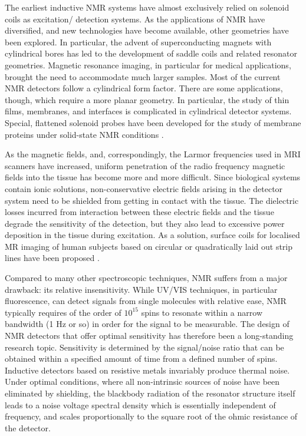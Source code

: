 The earliest inductive NMR systems have almost exclusively relied on solenoid coils as excitation/
detection systems. As the applications of NMR have diversified, and new technologies have become 
available, other geometries have been explored. In particular, the advent of superconducting magnets 
with cylindrical bores has led to the development of saddle coils and related resonator geometries. 
Magnetic resonance imaging, in particular for medical applications, brought the need to accommodate 
much larger samples. 
Most of the current NMR detectors follow a cylindrical form factor. There are some 
applications, though, which require a more planar geometry. In particular, the study of thin films, 
membranes, and interfaces is complicated in cylindrical detector systems. Special, flattened solenoid 
probes have been developed for the study of membrane proteins under solid-state NMR conditions
\cite{Bechinger:1991in}. 

As the magnetic fields, and, correspondingly, the Larmor frequencies used in MRI scanners 
have increased, uniform penetration of the radio frequency magnetic fields into the tissue has become 
more and more difficult. Since biological systems contain ionic solutions, non-conservative electric 
fields arising in the detector system need to be shielded from getting in contact with the tissue. The 
dielectric losses incurred from interaction between these electric fields and the tissue degrade the 
sensitivity of the detection, but they also lead to excessive power deposition in the tissue during 
excitation. As a solution, surface coils for localised MR imaging of human subjects based on circular 
or quadratically laid out strip lines have been proposed \cite{Zhang:2001js}.


Compared to many other spectroscopic techniques, NMR suffers from a major drawback: its relative 
insensitivity. While UV/VIS techniques, in particular fluorescence, can detect signals from single 
molecules with relative ease, NMR typically requires of the order of $10^{15}$ spins to resonate within a 
narrow bandwidth (1 Hz or so) in order for the signal to be measurable. 
The design of NMR detectors that offer optimal sensitivity has therefore been a long-standing research 
topic. Sensitivity is determined by the signal/noise ratio that can be obtained 
within a specified amount of time from a defined number of spins. Inductive detectors based on 
resistive metals invariably produce thermal noise. Under optimal conditions, where all non-intrinsic 
sources of noise have been eliminated by shielding, the blackbody radiation of the resonator structure 
itself leads to a noise voltage spectral density which is essentially independent of frequency, and 
scales proportionally to the square root of the ohmic resistance of the detector. 

